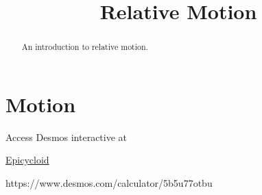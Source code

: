 \documentclass{ximera}
\title{Relative Motion}
\begin{document}
\begin{abstract}
An introduction to relative motion.
\end{abstract}
\maketitle

\section{Motion}







\begin{exploration}


Access Desmos interactive at
 
\href{https://www.desmos.com/calculator/5b5u77otbu}{Epicycloid}

 
\begin{onlineOnly}
    \begin{center}
\end{center}
\end{onlineOnly}

https://www.desmos.com/calculator/5b5u77otbu


\end{exploration}
\end{document}

